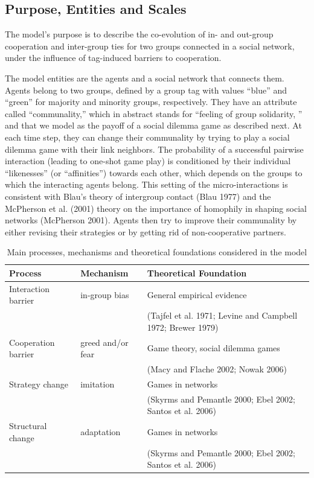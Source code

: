 \subsection{Purpose, Entities and Scales}
The model's purpose is to describe the co-evolution of in- and out-group cooperation and inter-group ties for two groups connected in a social network, under the influence of tag-induced barriers to cooperation.

The model entities are the agents and a social network that connects them. Agents belong to two groups, defined by a group tag with values ``blue'' and ``green'' for majority and minority groups, respectively. They have an attribute called ``communality,'' which in abstract stands for ``feeling of group solidarity, '' and that we model as the payoff of a social dilemma game as described next. At each time step, they can change their communality by trying to play a social dilemma game with their link neighbors. The probability of a successful pairwise interaction (leading to one-shot game play) is conditioned by their individual ``likenesses'' (or ``affinities'') towards each other, which depends on the groups to which the interacting agents belong. This setting of the micro-interactions is consistent with Blau's theory of intergroup contact (Blau 1977) and the McPherson et al. (2001) theory on the importance of homophily in shaping social networks (McPherson 2001). Agents then try to improve their communality by either revising their strategies or by getting rid of non-cooperative partners. 
\begin{table}[t!] \centering
	\small
	\begin{tabular}{lll}
		\hline
		\textbf{Process} & \textbf{Mechanism}  & \textbf{Theoretical Foundation}  \\
		\hline
		\rule{0pt}{0ex} Interaction barrier & in-group bias & General empirical evidence \\
		& & (Tajfel et al. 1971; Levine and Campbell 1972; Brewer 1979)\\
		\rule{0pt}{4ex} Cooperation barrier  & greed and/or fear & Game theory, social dilemma games \\
		& & (Macy and Flache 2002; Nowak 2006)\\
		\rule{0pt}{4ex} Strategy change    & imitation & Games in networks \\
		& & (Skyrms and Pemantle 2000; Ebel 2002; Santos et al. 2006)\\
		\rule{0pt}{4ex} Structural change & adaptation & Games in networks \\
		& & (Skyrms and Pemantle 2000; Ebel 2002; Santos et al. 2006)\\		
		\hline
	\end{tabular}
	\caption{Main processes, mechanisms and theoretical foundations considered in the model}
	\label{tab:Processes}
\end{table}

